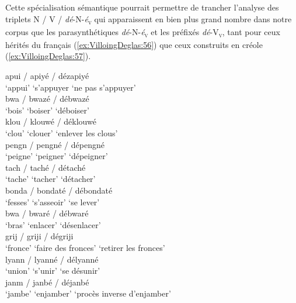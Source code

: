 \documentclass[output=paper]{langsci/langscibook}
\begin{document}
Cette spécialisation sémantique pourrait permettre de trancher l'analyse
des triplets N / V / \emph{dé}-N-\emph{é}\textsubscript{\textsc{v}} qui apparaissent en bien
plus grand nombre dans notre corpus que les parasynthétiques
\emph{dé}-N-\emph{é}\textsubscript{\textsc{v}} et les préfixés \emph{dé}-V\textsubscript{\textsc{v}}, tant
pour ceux hérités du français (\ref{ex:VilloingDeglas:56}) que ceux construits en créole (\ref{ex:VilloingDeglas:57}).

\ea \label{ex:VilloingDeglas:56}
        \ea \gll apui / apiyé  / dézapiyé\\
          {`appui'} {} {`s'appuyer} {}  {`ne pas s'appuyer'}\\
        \ex \gll  bwa / bwazé / débwazé \\
          {`bois'} {} {`boiser'} {} {`déboiser'}\\
        \ex \gll  klou / klouwé / déklouwé \\
          {`clou'} {} {`clouer'} {} {`enlever les clous'}\\
        \ex \gll  pengn / pengné / dépengné \\
          {`peigne'} {} {`peigner'} {} {`dépeigner'}\\
        \ex \gll  tach / taché / détaché \\
          {`tache'} {} {`tacher'} {} {`détacher'}\\
        \z
  \ex \label{ex:VilloingDeglas:57}
        \ea \gll bonda / bondaté / débondaté \\
          {`fesses'} {} {`s'asseoir'} {} {`se lever'}\\
        \ex \gll  bwa / bwaré / débwaré \\
          {`bras'} {} {`enlacer'} {} {`désenlacer'}\\
        \ex \gll  grij / griji / dégriji \\
          {`fronce'} {} {`faire des fronces'} {} {`retirer les fronces'}\\
        \ex \gll  lyann / lyanné / délyanné \\
          {`union'} {} {`s'unir'} {} {`se désunir'}\\
        \ex \gll  janm / janbé / déjanbé \\
          {`jambe'} {} {`enjamber'} {} {`procès inverse d'enjamber'}\\
        \z
  \z
\end{document}
